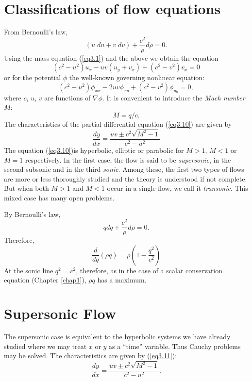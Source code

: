 \section{Classifications of flow equations}\label{chap3:sec3.2}
From Bernoulli's law, 
$$
(u \; du + v \; dv ) + \frac{c^2}{\rho} d \rho = 0.
$$
Using the mass equation (\ref{eq3.1}) and the above we obtain the equation 
\begin{equation*}
(c^2 - u^2) u_x - uv (u_y + v_x) + (c^2 - v^2)  v_x = 0 
\tag{3.9}\label{eq3.9}
\end{equation*}
or for the potential $\phi$ the well-known governing nonlinear equation:
\begin{equation*}
(c^2 - u^2) \phi_{xx} - 2 uv \phi_{xy} + (c^2 -v^2) \phi_{yy} = 0 ,
\tag{3.10}\label{eq3.10}
\end{equation*}
where $c$, $u$, $v$ are functions of $\nabla \phi$. It is convenient to introduce the {\em Mach number} $M$:
$$
M = q/c.
$$
The characteristics of the partial differential equation (\ref{eq3.10}) are given by
\begin{equation*}
\frac{dy}{dx} = \frac{uv \pm c^2 \sqrt{M^2 - 1}}{c^2 - u^2}
\tag{3.11}\label{eq3.11}
\end{equation*}
The equation (\ref{eq3.10})\pageoriginale is hyperbolic, elliptic or parabolic for $M >1$, $M<1$ or $M=1$ respectively.  In the first case, the flow is said to be {\em supersonic}, in the second subsonic and in the third {\em sonic}. Among these, the first two types of flows are more or less thoroughly studied and the theory is understood if not complete. But when both $M>1$ and $M<1$ occur in a single flow, we call it {\em transonic}. This mixed case has many open problems.

\begin{remark*}
By Bernoulli's law,
$$
qdq + \frac{c^2}{\rho} d\rho = 0.
$$
Therefore,
$$
\frac{d}{dq} (\rho q) = \rho (1 -\frac{q^2}{c^2})
$$
At the sonic line $q^2 =c^2$, therefore, as in the case of a scalar conservation equation (Chapter \ref{chap1}), $\rho q$ has a maximum.
\end{remark*}

\section{Supersonic Flow}\label{chap3:sec3.3}

The supersonic case is equivalent to the hyperbolic systems we have already studied where we may treat $x$ or $y$ as a ``time'' variable. Thus Cauchy problems may be solved. The characteristics are given by (\ref{eq3.11}):
$$
\frac{dy}{dx} = \frac{uv \pm c^2 \sqrt{M^2 -1}}{c^2 - u^2}.
$$

